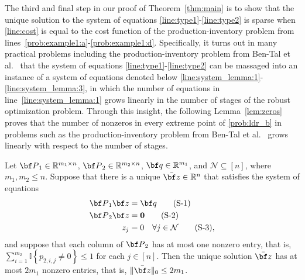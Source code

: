 \documentclass[nonblindrev,mnsc]{informs3} %
\newcommand{\bq}{{\bf q}}
\newcommand{\bz}{{\bf z}}
\newcommand{\bbp}{{\bf P}}
\def\Real{\mathbb{R}}
\let\R\Real
\newcommand{\bzero}{{\boldsymbol{0}}}
\begin{document}
The third and final step in our proof of Theorem~\ref{thm:main} is to show that the unique solution to the system of equations \eqref{line:type1}-\eqref{line:type2} is sparse when \eqref{line:cost} is equal to the cost function of the production-inventory problem from lines~\eqref{prob:example1:a}-\eqref{prob:example1:d}. 
Specifically, it turns out in many practical problems including the production-inventory problem from Ben-Tal et al.~\cite{ben2004adjustable} 
that the system of equations \eqref{line:type1}-\eqref{line:type2} can be massaged into an instance of a system of equations denoted below \eqref{line:system_lemma:1}-\eqref{line:system_lemma:3}, in which the number of equations in line~\eqref{line:system_lemma:1} grows  linearly in the number of stages of the robust optimization problem. Through this insight, the following Lemma~\ref{lem:zeros} proves that the number of nonzeros in every extreme point of \eqref{prob:ldr_b} in  problems such as the  production-inventory problem from Ben-Tal et al.~\cite{ben2004adjustable} grows linearly with respect to the number of stages. 


\begin{lemma} \label{lem:zeros}
Let $\bbp_1 \in \R^{m_1 \times n}$, $\bbp_2 \in \R^{m_2 \times n}$, $\bq \in \R^{m_1}$, and $\mathcal{N} \subseteq [n]$, where $m_1, m_2 \le n$. Suppose that there is a unique $\bar{\bz} \in \R^n$  that satisfies the system of equations
\begin{align}
\bbp_1 \bz &= \bq \label{line:system_lemma:1} \tag{S-1}\\
\bbp_2 \bz &= \bzero \label{line:system_lemma:2} \tag{S-2}\\
z_j &= 0 \quad \forall j \in \mathcal{N} \label{line:system_lemma:3} \tag{S-3},
\end{align}
and suppose that each column of $\bbp_2$ has at most one nonzero entry, that is, $\sum_{i=1}^{m_2} \mathbb{I} \left \{ p_{2,i,j} \neq 0 \right \} \le 1$ for each $j \in [n]$. Then the unique solution $\bar{\bz}$ has at most $2 m_1$ nonzero entries, that is, $\| \bar{\bz} \|_0 \le 2m_1$. 
\end{lemma}
\end{document}
